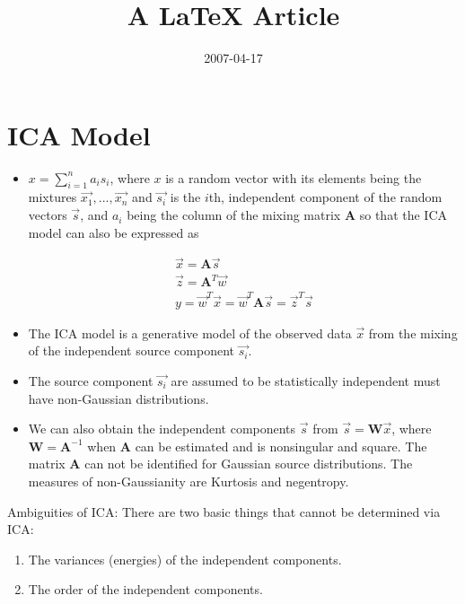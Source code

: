 \documentclass[]{article}
\title{A LaTeX Article}
\author{  }
\date{2007-04-17}
\begin{document}
\ifpdf
{}
\else
{}
\fi

\maketitle


\begin{abstract}
\end{abstract}

\section{ICA Model}
\begin{itemize}

	\item $x = \sum_{i=1}^n a_i s_i$, where $x$ is a random vector with its elements being the mixtures $\vec{x_1}, ..., \vec{x_n}$ and $\vec{s_i}$ is the $i$th, independent component of the random vectors $\vec{s}$, and $a_i$ being the column of the mixing matrix $\mathbf{A}$ so that the ICA model can also be expressed as 

\begin{eqnarray}
\vec{x} = \mathbf{A}\vec{s} \\
\vec{z} = \mathbf{A}^T \vec{w} \\
y = \vec{w}^T \vec{x} = \vec{w}^T \mathbf{A}\vec{s} = \vec{z}^T\vec{s} \label{whittening_ICA}
\end{eqnarray}
	\item The ICA model is a generative model of the observed data $\vec{x}$ from the mixing of the independent source component $\vec{s_i}$.
	\item The source component $\vec{s_i}$ are assumed to be statistically independent must have non-Gaussian distributions. 
	\item We can also obtain the independent components $\vec{s}$ from $\vec{s} = \mathbf{W}\vec{x}$, where $\mathbf{W} = \mathbf{A}^{-1}$ when $\mathbf{A}$ can be estimated and is nonsingular and square.  The matrix $\mathbf{A}$ can not be identified for Gaussian source distributions. The measures of non-Gaussianity are Kurtosis and negentropy.  
\end{itemize}

Ambiguities of ICA:  There are two basic things that cannot be determined via ICA:
\begin{enumerate}
	\item The variances (energies) of the independent components.
	\item The order of the independent components.
\end{enumerate}
\end{document}
